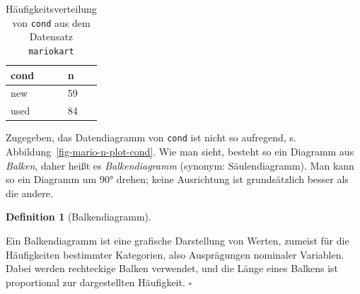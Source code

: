 \documentclass[
  letterpaper,
  twoside,
  open=any]{scrbook}
\theoremstyle{definition}
\newtheorem{definition}{Definition}[chapter]
\theoremstyle{definition}
\theoremstyle{definition}
\theoremstyle{remark}
\begin{document}
\begin{longtable}[]{@{}ll@{}}

\caption{\label{tbl-wheels-n}Häufigkeitsverteilung von \texttt{cond} aus
dem Datensatz \texttt{mariokart}}

\tabularnewline

\toprule\noalign{}
cond & n \\
\midrule\noalign{}
\endhead
\bottomrule\noalign{}
\endlastfoot
new & 59 \\
used & 84 \\

\end{longtable}

Zugegeben, das Datendiagramm von \texttt{cond} ist nicht so aufregend,
s. Abbildung~\ref{fig-mario-n-plot-cond}. Wie man sieht, besteht so ein
Diagramm aus \emph{Balken}, daher heißt es \emph{Balkendiagramm}
(synonym: Säulendiagramm). Man kann so ein Diagramm um 90° drehen; keine
Ausrichtung ist grundsätzlich besser als die andere.

\begin{definition}[Balkendiagramm]\protect\hypertarget{def-balken}{}\label{def-balken}

Ein Balkendiagramm ist eine grafische Darstellung von Werten, zumeist
für die Häufigkeiten bestimmter Kategorien, also Ausprägungen nominaler
Variablen. Dabei werden rechteckige Balken verwendet, und die Länge
eines Balkens ist proportional zur dargestellten Häufigkeit. \(\square\)

\end{definition}
\end{document}
